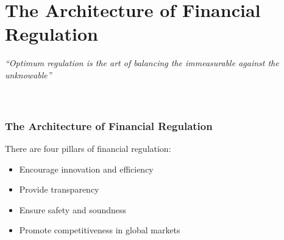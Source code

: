 \documentclass[11pt]{beamer}
\begin{document}


\section{The Architecture of Financial Regulation}\label{Sec::Chapter1}
%


\begin{frame}

\textit{``Optimum regulation is the art of balancing the immeasurable against the unknowable''}
~\\
~\\
~\\
\pause
\frametitle{The Architecture of Financial Regulation}
There are four pillars of financial regulation:
\begin{itemize}\itemsep10pt
\item Encourage innovation and efficiency
\item Provide transparency
\item Ensure safety and soundness
\item Promote competitiveness in global markets
\end{itemize}
		\end{frame}

\end{document}
